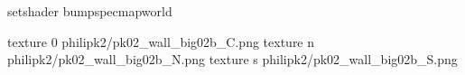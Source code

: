 setshader bumpspecmapworld

texture 0 philipk2/pk02_wall_big02b_C.png
texture n philipk2/pk02_wall_big02b_N.png
texture s philipk2/pk02_wall_big02b_S.png

